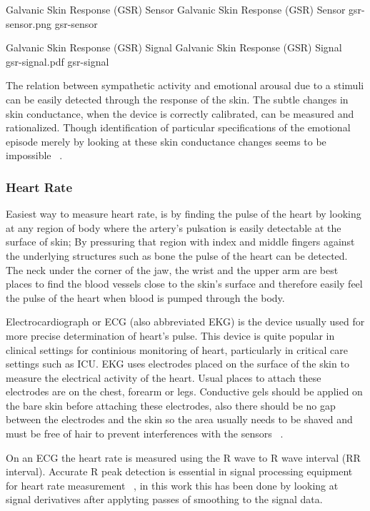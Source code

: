\img
{Galvanic Skin Response (GSR) Sensor}
{Galvanic Skin Response (GSR) Sensor}
{gsr-sensor.png}
{gsr-sensor}

\img
{Galvanic Skin Response (GSR) Signal}
{Galvanic Skin Response (GSR) Signal ~\cite{wiki2014gsr}}
{gsr-signal.pdf}
{gsr-signal}

The relation between sympathetic activity and emotional arousal due to a stimuli can be easily detected through the response of the skin. The subtle changes in skin conductance, when the device is correctly calibrated, can be measured and rationalized. Though identification of particular specifications of the emotional episode merely by looking at these skin conductance changes seems to be impossible ~\cite{pflanzer2013galvanic}.

\subsubsection{Heart Rate}
Easiest way to measure heart rate, is by finding the pulse of the heart by looking at any region of body where the artery's pulsation is easily detectable at the surface of skin; By pressuring that region with index and middle fingers against the underlying structures such as bone the pulse of the heart can be detected. The neck under the corner of the jaw, the wrist and the upper arm are best places to find the blood vessels close to the skin's surface and therefore easily feel the pulse of the heart when blood is pumped through the body.

Electrocardiograph or ECG (also abbreviated EKG) is the device usually used for more precise determination of heart's pulse. This device is quite popular in clinical settings for continious monitoring of heart, particularly in critical care settings such as ICU. EKG uses electrodes placed on the surface of the skin to measure the electrical activity of the heart. Usual places to attach these electrodes are on the chest, forearm or legs. Conductive gels should be applied on the bare skin before attaching these electrodes, also there should be no gap between the electrodes and the skin so the area usually needs to be shaved and must be free of hair to prevent interferences with the sensors ~\cite{stern2001psychophysiological}.

On an ECG the heart rate is measured using the R wave to R wave interval (RR interval). Accurate R peak detection is essential in signal processing equipment for heart rate measurement ~\cite{pise2011thinkquest}, in this work this has been done by looking at signal derivatives after applyting passes of smoothing to the signal data.

